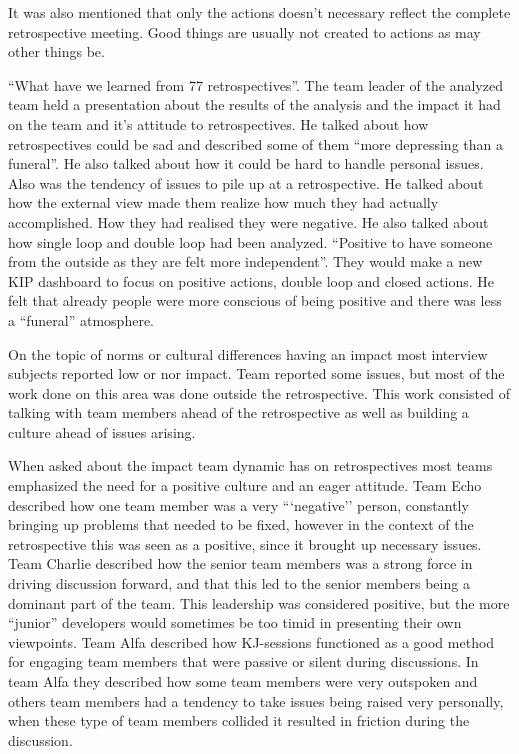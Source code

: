 It was also mentioned that only the actions doesn't necessary reflect the complete retrospective meeting. Good things are usually not created to actions as may other things be. 

\label{fb-s-2}

``What have we learned from 77 retrospectives''. The team leader of the analyzed team held a presentation about the results of the analysis and the impact it had on the team and it's attitude to retrospectives. He talked about how retrospectives could be sad and described some of them ``more depressing than a funeral''. He also talked about how it could be hard to handle personal issues. Also was the tendency of issues to pile up at a retrospective. He talked about how the external view made them realize how much they had actually accomplished. How they had realised they were negative. He also talked about how single loop and double loop had been analyzed. ``Positive to have someone from the outside as they are felt more independent''. They would make a new KIP dashboard to focus on positive actions, double loop and closed actions. He felt that already people were more conscious of being positive and there was less a ``funeral'' atmosphere.  

\label{question-19}
On the topic of norms or cultural differences having an impact most interview subjects reported low or nor impact. Team  reported some issues, but most of the work done on this area was done outside the retrospective. This work consisted of talking with team members ahead of the retrospective as well as building a culture ahead of issues arising. 

\label{question-20}
When asked about the impact team dynamic has on retrospectives most teams emphasized the need for a positive culture and an eager attitude. Team Echo described how one team member was a very ```negative'' person, constantly bringing up problems that needed to be fixed, however in the context of the retrospective this was seen as a positive, since it brought up necessary issues. Team Charlie described how the senior team members was a strong force in driving discussion forward, and that this led to the senior members being a dominant part of the team. This leadership was considered positive, but the more ``junior'' developers would sometimes be too timid in presenting their own viewpoints. Team Alfa described how KJ-sessions functioned as a good method for engaging team members that were passive or silent during discussions. In team Alfa they described how some team members were very outspoken and others team members had a tendency to take issues being raised very personally, when these type of team members collided it resulted in friction during the discussion. 

